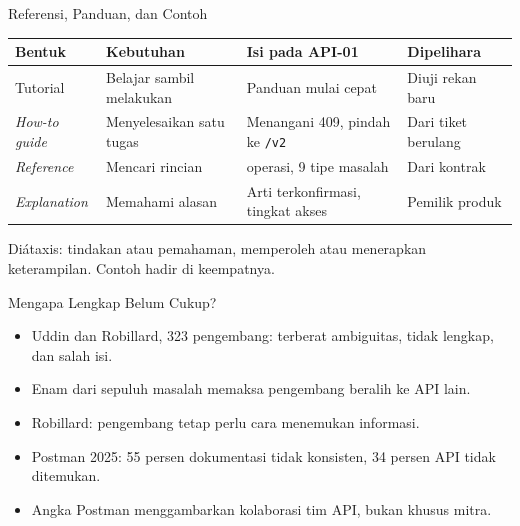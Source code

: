 \documentclass[aspectratio=169, table, 12pt]{beamer}
\begin{document}
\begin{frame}{{\Large Referensi, Panduan, dan Contoh}}
  \vspace{4pt}
  \footnotesize
  \begin{tabularx}{\textwidth}{>{\raggedright\arraybackslash}p{2.2cm} >{\raggedright\arraybackslash}p{3.4cm} >{\raggedright\arraybackslash}X >{\raggedright\arraybackslash}p{2.9cm}}
    \hline
    \textbf{Bentuk} & \textbf{Kebutuhan} & \textbf{Isi pada API-01} & \textbf{Dipelihara} \\ \hline
    Tutorial & Belajar sambil melakukan & Panduan mulai cepat & Diuji rekan baru \\ \hline
    \textit{How-to guide} & Menyelesaikan satu tugas & Menangani 409, pindah ke \texttt{/v2} & Dari tiket berulang \\ \hline
    \textit{Reference} & Mencari rincian & 4 operasi, 9 tipe masalah & Dari kontrak \\ \hline
    \textit{Explanation} & Memahami alasan & Arti terkonfirmasi, tingkat akses & Pemilik produk \\ \hline
  \end{tabularx}

  \vspace{6pt}
  \small Diátaxis: tindakan atau pemahaman, memperoleh atau menerapkan keterampilan. Contoh hadir di keempatnya.
\end{frame}

\begin{frame}{{\Large Mengapa Lengkap Belum Cukup?}}
  \vspace{8pt}
  \begin{itemize}
    \item Uddin dan Robillard, 323 pengembang: terberat ambiguitas, tidak lengkap, dan salah isi.
    \item Enam dari sepuluh masalah memaksa pengembang beralih ke API lain.
    \item Robillard: pengembang tetap perlu cara menemukan informasi.
    \item Postman 2025: 55 persen dokumentasi tidak konsisten, 34 persen API tidak ditemukan.
    \item Angka Postman menggambarkan kolaborasi tim API, bukan khusus mitra.
  \end{itemize}
\end{frame}
\end{document}
